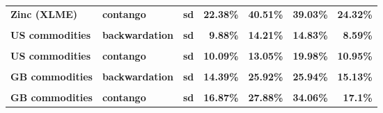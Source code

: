 \documentclass[
  authoryear,
  preprint,
  3p]{elsarticle}
\begin{document}
\begin{longtable}[t]{>{}l>{}l>{}l>{}r>{}r>{}r>{}r}
\textbf{Zinc (XLME)} & \textbf{contango} & \textbf{sd} & \textcolor[HTML]{4285f4}{\textbf{22.38\%}} & \textcolor[HTML]{4285f4}{\textbf{40.51\%}} & \textcolor[HTML]{4285f4}{\textbf{39.03\%}} & \textcolor[HTML]{4285f4}{\textbf{24.32\%}}\\
\addlinespace
\textbf{\cellcolor{gray!10}{US commodities}} & \textbf{\cellcolor{gray!10}{backwardation}} & \textbf{\cellcolor{gray!10}{mean}} & \textcolor[HTML]{4285f4}{\textbf{\cellcolor{gray!10}{***15.44\%}}} & \textcolor[HTML]{4285f4}{\textbf{\cellcolor{gray!10}{*15.66\%}}} & \textcolor[HTML]{4285f4}{\textbf{\cellcolor{gray!10}{13.4\%}}} & \textcolor[HTML]{4285f4}{\textbf{\cellcolor{gray!10}{6.82\%}}}\\
\textbf{US commodities} & \textbf{backwardation} & \textbf{sd} & \textcolor[HTML]{4285f4}{\textbf{9.88\%}} & \textcolor[HTML]{4285f4}{\textbf{14.21\%}} & \textcolor[HTML]{4285f4}{\textbf{14.83\%}} & \textcolor[HTML]{4285f4}{\textbf{8.59\%}}\\
\textbf{\cellcolor{gray!10}{US commodities}} & \textbf{\cellcolor{gray!10}{contango}} & \textbf{\cellcolor{gray!10}{mean}} & \textcolor[HTML]{4285f4}{\textbf{\cellcolor{gray!10}{-1.09\%}}} & \textcolor[HTML]{4285f4}{\textbf{\cellcolor{gray!10}{*16.16\%}}} & \textcolor[HTML]{4285f4}{\textbf{\cellcolor{gray!10}{4.9\%}}} & \textcolor[HTML]{4285f4}{\textbf{\cellcolor{gray!10}{-6.33\%}}}\\
\textbf{US commodities} & \textbf{contango} & \textbf{sd} & \textcolor[HTML]{4285f4}{\textbf{10.09\%}} & \textcolor[HTML]{4285f4}{\textbf{13.05\%}} & \textcolor[HTML]{4285f4}{\textbf{19.98\%}} & \textcolor[HTML]{4285f4}{\textbf{10.95\%}}\\
\textbf{\cellcolor{gray!10}{GB commodities}} & \textbf{\cellcolor{gray!10}{backwardation}} & \textbf{\cellcolor{gray!10}{mean}} & \textcolor[HTML]{4285f4}{\textbf{\cellcolor{gray!10}{4.41\%}}} & \textcolor[HTML]{4285f4}{\textbf{\cellcolor{gray!10}{8.01\%}}} & \textcolor[HTML]{4285f4}{\textbf{\cellcolor{gray!10}{15.06\%}}} & \textcolor[HTML]{4285f4}{\textbf{\cellcolor{gray!10}{**19.95\%}}}\\
\addlinespace
\textbf{GB commodities} & \textbf{backwardation} & \textbf{sd} & \textcolor[HTML]{4285f4}{\textbf{14.39\%}} & \textcolor[HTML]{4285f4}{\textbf{25.92\%}} & \textcolor[HTML]{4285f4}{\textbf{25.94\%}} & \textcolor[HTML]{4285f4}{\textbf{15.13\%}}\\
\textbf{\cellcolor{gray!10}{GB commodities}} & \textbf{\cellcolor{gray!10}{contango}} & \textbf{\cellcolor{gray!10}{mean}} & \textcolor[HTML]{4285f4}{\textbf{\cellcolor{gray!10}{0.34\%}}} & \textcolor[HTML]{4285f4}{\textbf{\cellcolor{gray!10}{*35.56\%}}} & \textcolor[HTML]{4285f4}{\textbf{\cellcolor{gray!10}{-5.24\%}}} & \textcolor[HTML]{4285f4}{\textbf{\cellcolor{gray!10}{-14.05\%}}}\\
\textbf{GB commodities} & \textbf{contango} & \textbf{sd} & \textcolor[HTML]{4285f4}{\textbf{16.87\%}} & \textcolor[HTML]{4285f4}{\textbf{27.88\%}} & \textcolor[HTML]{4285f4}{\textbf{34.06\%}} & \textcolor[HTML]{4285f4}{\textbf{17.1\%}}\\
\bottomrule

\end{longtable}
\end{document}
